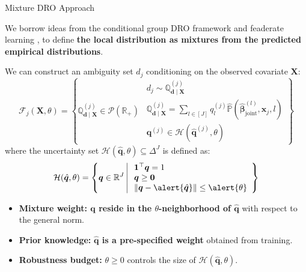 \documentclass{beamer}
\newcommand{\mb}[1]{{\mathbf{#1}}}
\newcommand{\txrd}[1]{{\textcolor{sintefred}{\textbf{#1}}}}
\newcommand{\bbp}{\mathbb{P}}
\newcommand{\bbq}{\mathbb{Q}}
\newcommand{\bbr}{\mathbb{R}}
\begin{document}
\begin{frame}{Mixture DRO Approach}

We borrow ideas from the conditional group DRO framework and feaderate learning  \citep{marfoq2021federated, wang2025distributionally}, to define \txrd{the local distribution as mixtures from the predicted empirical distributions}. 

\vspace{0.3cm}
We can construct an ambiguity set $d_j$ conditioning on the observed covariate $\mb X$:
{\large 
\[
\mathcal{F}_j(\mb X, \theta) = \left \{ 
	\bbq^{(j)}_{\bm d \mid \mb X} \in \mathcal{P}(\bbr_+) \ 
	\begin{array}{|ll} 
	\ d_j \sim \bbq^{(j)}_{\bm d \mid \mb X}	\\ 
	\
	\bbq^{(j)}_{\bm d \mid \mb X} = \sum_{l \in [J]} q_l^{(j)} \hat{\bbp}(\hat{\bm \beta}_{\text{joint}}^{(l)},\bm x_j, l)  \\
	\ \bm q^{(j)} \in \mathcal{H}(\hat{\bm q}^{(j)} , \theta)
	\end{array}
	\right  \}
\]
}
where the uncertainty set $\mathcal{H}(\hat{\bm q}, \theta) \subseteq \Delta^J$ is defined as:
{\large
\[
\mathcal{H}(\hat{\bm q}, \theta) = \left \{ \bm q \in \bbr^J \
\begin{array}{|ll} \
	\bm 1 ^\top \bm q = 1 \\
	\ \bm q \geq \bm 0 \\
	\ \|\bm q - \alert{\hat{\bm q}} \| \leq \alert{\theta}
\end{array}
\right \} 
\]
}
\begin{itemize}
    \item \txrd{Mixture weight: $\bm q$ reside in the $\theta$-neighborhood of $\hat{\bm q}$} with respect to the general norm. 
    \item \txrd{Prior knowledge:} \txrd{$\hat{\bm q}$ is a pre-specified weight} obtained from training. 
    \item \txrd{Robustness budget:} $\theta \geq 0$ controls the size of $\mathcal{H}(\hat{\bm q}, \theta)$.
\end{itemize}

\end{frame}

\end{document}
